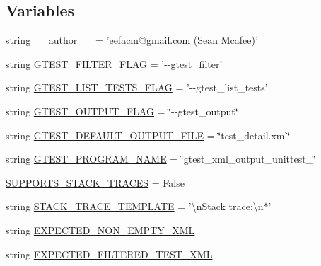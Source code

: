 \subsection*{Variables}
\begin{DoxyCompactItemize}
\item 
string \hyperlink{namespacegtest__xml__output__unittest_a14db59ae462df049de11ee863be54f09}{\-\_\-\-\_\-author\-\_\-\-\_\-} = 'eefacm@gmail.\-com (Sean Mcafee)'
\item 
string \hyperlink{namespacegtest__xml__output__unittest_ab914acfbfbc3f6f5ee3f1e83134c7204}{G\-T\-E\-S\-T\-\_\-\-F\-I\-L\-T\-E\-R\-\_\-\-F\-L\-A\-G} = '-\/-\/gtest\-\_\-filter'
\item 
string \hyperlink{namespacegtest__xml__output__unittest_aafe4dd234e72bbb61f4f34689fbca5c4}{G\-T\-E\-S\-T\-\_\-\-L\-I\-S\-T\-\_\-\-T\-E\-S\-T\-S\-\_\-\-F\-L\-A\-G} = '-\/-\/gtest\-\_\-list\-\_\-tests'
\item 
string \hyperlink{namespacegtest__xml__output__unittest_a96dc60b3ea1b2ced315835227f77e10d}{G\-T\-E\-S\-T\-\_\-\-O\-U\-T\-P\-U\-T\-\_\-\-F\-L\-A\-G} = \char`\"{}-\/-\/gtest\-\_\-output\char`\"{}
\item 
string \hyperlink{namespacegtest__xml__output__unittest_a5591d7d52a46da09d06ed3e9ec18711a}{G\-T\-E\-S\-T\-\_\-\-D\-E\-F\-A\-U\-L\-T\-\_\-\-O\-U\-T\-P\-U\-T\-\_\-\-F\-I\-L\-E} = \char`\"{}test\-\_\-detail.\-xml\char`\"{}
\item 
string \hyperlink{namespacegtest__xml__output__unittest_ab89cc5b402310ef67bcaf38fa5017461}{G\-T\-E\-S\-T\-\_\-\-P\-R\-O\-G\-R\-A\-M\-\_\-\-N\-A\-M\-E} = \char`\"{}gtest\-\_\-xml\-\_\-output\-\_\-unittest\-\_\-\char`\"{}
\item 
\hyperlink{namespacegtest__xml__output__unittest_a519f8e4f456ccde7946910725de578a9}{S\-U\-P\-P\-O\-R\-T\-S\-\_\-\-S\-T\-A\-C\-K\-\_\-\-T\-R\-A\-C\-E\-S} = False
\item 
string \hyperlink{namespacegtest__xml__output__unittest_abd57c1a4124b74d2ba63d03734df491d}{S\-T\-A\-C\-K\-\_\-\-T\-R\-A\-C\-E\-\_\-\-T\-E\-M\-P\-L\-A\-T\-E} = '\textbackslash{}n\-Stack trace\-:\textbackslash{}n$\ast$'
\item 
string \hyperlink{namespacegtest__xml__output__unittest_ab6a01b4b81a702e476f53b1b3c4983c0}{E\-X\-P\-E\-C\-T\-E\-D\-\_\-\-N\-O\-N\-\_\-\-E\-M\-P\-T\-Y\-\_\-\-X\-M\-L}
\item 
string \hyperlink{namespacegtest__xml__output__unittest_a1adb060422f833cb8b99403d13144399}{E\-X\-P\-E\-C\-T\-E\-D\-\_\-\-F\-I\-L\-T\-E\-R\-E\-D\-\_\-\-T\-E\-S\-T\-\_\-\-X\-M\-L}

\end{DoxyCompactItemize}
